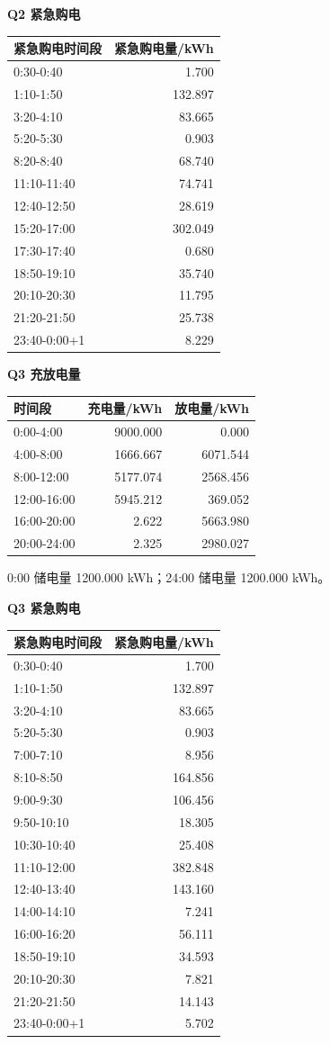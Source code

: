 \textbf{Q2 紧急购电}
\begin{longtable}[]{@{}lr@{}}\toprule 紧急购电时间段 & 紧急购电量/kWh \\\midrule\endhead
0:30-0:40 & 1.700 \\
1:10-1:50 & 132.897 \\
3:20-4:10 & 83.665 \\
5:20-5:30 & 0.903 \\
8:20-8:40 & 68.740 \\
11:10-11:40 & 74.741 \\
12:40-12:50 & 28.619 \\
15:20-17:00 & 302.049 \\
17:30-17:40 & 0.680 \\
18:50-19:10 & 35.740 \\
20:10-20:30 & 11.795 \\
21:20-21:50 & 25.738 \\
23:40-0:00+1 & 8.229 \\
\bottomrule\end{longtable}

\textbf{Q3 充放电量}
\begin{longtable}[]{@{}lrr@{}}\toprule 时间段 & 充电量/kWh & 放电量/kWh \\\midrule\endhead
0:00-4:00 & 9000.000 & 0.000 \\
4:00-8:00 & 1666.667 & 6071.544 \\
8:00-12:00 & 5177.074 & 2568.456 \\
12:00-16:00 & 5945.212 & 369.052 \\
16:00-20:00 & 2.622 & 5663.980 \\
20:00-24:00 & 2.325 & 2980.027 \\
\bottomrule\end{longtable}
0:00 储电量 1200.000 kWh；24:00 储电量 1200.000 kWh。

\textbf{Q3 紧急购电}
\begin{longtable}[]{@{}lr@{}}\toprule 紧急购电时间段 & 紧急购电量/kWh \\\midrule\endhead
0:30-0:40 & 1.700 \\
1:10-1:50 & 132.897 \\
3:20-4:10 & 83.665 \\
5:20-5:30 & 0.903 \\
7:00-7:10 & 8.956 \\
8:10-8:50 & 164.856 \\
9:00-9:30 & 106.456 \\
9:50-10:10 & 18.305 \\
10:30-10:40 & 25.408 \\
11:10-12:00 & 382.848 \\
12:40-13:40 & 143.160 \\
14:00-14:10 & 7.241 \\
16:00-16:20 & 56.111 \\
18:50-19:10 & 34.593 \\
20:10-20:30 & 7.821 \\
21:20-21:50 & 14.143 \\
23:40-0:00+1 & 5.702 \\
\bottomrule\end{longtable}

